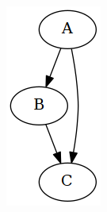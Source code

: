 \begin{figure}[htbp]
	\centering
	\begin{subfigure}[ht]{0.10\textwidth}
		
		\includegraphics[width=\textwidth]{inc/primitives/if.png}

\end{subfigure}
\end{figure}
